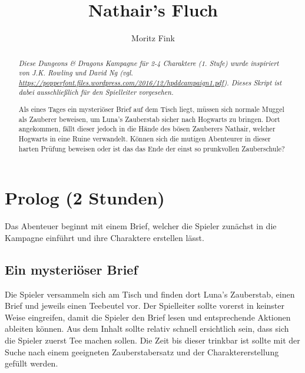 \documentclass[]{scrartcl}
\title{Nathair's Fluch}
\author{Moritz Fink}
\begin{document}
\maketitle

\begin{abstract}
\textit{
Diese Dungeons \& Dragons Kampagne für 2-4 Charaktere (1. Stufe) wurde inspiriert von J.K. Rowling und David Ng (vgl. \url{https://popperfont.files.wordpress.com/2016/12/hpddcampaign1.pdf}). Dieses Skript ist dabei ausschließlich für den Spielleiter vorgesehen.\\
}

Als eines Tages ein mysteriöser Brief auf dem Tisch liegt, müssen sich normale Muggel als Zauberer beweisen, um Luna's Zauberstab sicher nach Hogwarts zu bringen. Dort angekommen, fällt dieser jedoch in die Hände des bösen Zauberers Nathair, welcher Hogwarts in eine Ruine verwandelt. Können sich die mutigen Abenteurer in dieser harten Prüfung beweisen oder ist das das Ende der einst so prunkvollen Zauberschule?
\end{abstract}

\newpage

\tableofcontents

\newpage

\section{Prolog (2 Stunden)}

Das Abenteuer beginnt mit einem Brief, welcher die Spieler zunächst in die Kampagne einführt und ihre Charaktere erstellen lässt.

\subsection{Ein mysteriöser Brief}

Die Spieler versammeln sich am Tisch und finden dort Luna's Zauberstab, einen Brief und jeweils einen Teebeutel vor. Der Spielleiter sollte vorerst in keinster Weise eingreifen, damit die Spieler den Brief lesen und entsprechende Aktionen ableiten können. Aus dem Inhalt sollte relativ schnell ersichtlich sein, dass sich die Spieler zuerst Tee machen sollen. Die Zeit bis dieser trinkbar ist sollte mit der Suche nach einem geeigneten Zauberstabersatz und der Charaktererstellung gefüllt werden.

\newpage
\end{document}
